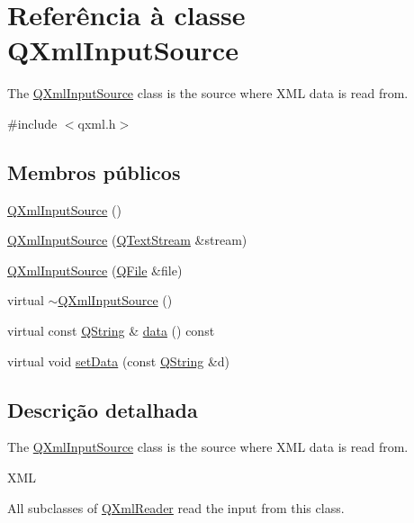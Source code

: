 \hypertarget{class_q_xml_input_source}{\section{Referência à classe Q\-Xml\-Input\-Source}
\label{class_q_xml_input_source}
}


The \hyperlink{class_q_xml_input_source}{Q\-Xml\-Input\-Source} class is the source where X\-M\-L data is read from.  




{\ttfamily \#include $<$qxml.\-h$>$}

\subsection*{Membros públicos}
\begin{DoxyCompactItemize}
\item 
\hyperlink{class_q_xml_input_source_a0dc09aa030517cf3f9c90437f358510d}{Q\-Xml\-Input\-Source} ()
\item 
\hyperlink{class_q_xml_input_source_a44efbcd5ae15377b7f592b9ed43ef9bb}{Q\-Xml\-Input\-Source} (\hyperlink{class_q_text_stream}{Q\-Text\-Stream} \&stream)
\item 
\hyperlink{class_q_xml_input_source_a5fa4e91d32fa6eecbb15f309d250084e}{Q\-Xml\-Input\-Source} (\hyperlink{class_q_file}{Q\-File} \&file)
\item 
virtual \hyperlink{class_q_xml_input_source_aaf6decca87efb5b0f810f153d8647199}{$\sim$\-Q\-Xml\-Input\-Source} ()
\item 
virtual const \hyperlink{class_q_string}{Q\-String} \& \hyperlink{class_q_xml_input_source_a0773c859aefa9bda51be5b5073d80f84}{data} () const 
\item 
virtual void \hyperlink{class_q_xml_input_source_ab49c457f6bdb889ea4972db16de29644}{set\-Data} (const \hyperlink{class_q_string}{Q\-String} \&d)
\end{DoxyCompactItemize}


\subsection{Descrição detalhada}
The \hyperlink{class_q_xml_input_source}{Q\-Xml\-Input\-Source} class is the source where X\-M\-L data is read from. 

X\-M\-L

All subclasses of \hyperlink{class_q_xml_reader}{Q\-Xml\-Reader} read the input from this class. 

